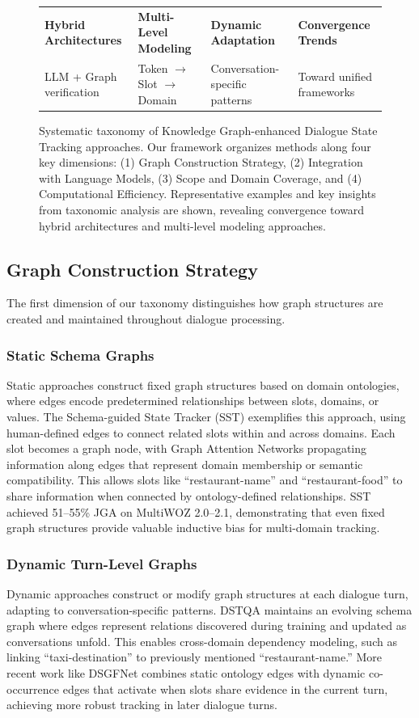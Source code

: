 \documentclass[11pt]{article}
\begin{document}
\begin{figure}[t]
\begin{tabular}{|p{3.5cm}|p{3.5cm}|p{3.5cm}|p{3.5cm}|}
\hline
\textbf{Hybrid Architectures} & \textbf{Multi-Level Modeling} & \textbf{Dynamic Adaptation} & \textbf{Convergence Trends} \\
LLM + Graph verification & Token $\rightarrow$ Slot $\rightarrow$ Domain & Conversation-specific patterns & Toward unified frameworks \\
\hline
\end{tabular}
\caption{Systematic taxonomy of Knowledge Graph-enhanced Dialogue State Tracking approaches. Our framework organizes methods along four key dimensions: (1) Graph Construction Strategy, (2) Integration with Language Models, (3) Scope and Domain Coverage, and (4) Computational Efficiency. Representative examples and key insights from taxonomic analysis are shown, revealing convergence toward hybrid architectures and multi-level modeling approaches.}
\label{fig:taxonomy}
\end{figure}

\subsection{Graph Construction Strategy}

The first dimension of our taxonomy distinguishes how graph structures are created and maintained throughout dialogue processing.

\subsubsection{Static Schema Graphs}
Static approaches construct fixed graph structures based on domain ontologies, where edges encode predetermined relationships between slots, domains, or values. The Schema-guided State Tracker (SST) \citep{Chen2020SST} exemplifies this approach, using human-defined edges to connect related slots within and across domains. Each slot becomes a graph node, with Graph Attention Networks propagating information along edges that represent domain membership or semantic compatibility. This allows slots like ``restaurant-name'' and ``restaurant-food'' to share information when connected by ontology-defined relationships. SST achieved 51–55\% JGA on MultiWOZ 2.0–2.1, demonstrating that even fixed graph structures provide valuable inductive bias for multi-domain tracking.

\subsubsection{Dynamic Turn-Level Graphs}
Dynamic approaches construct or modify graph structures at each dialogue turn, adapting to conversation-specific patterns. DSTQA \citep{Zhou2020DSTQA} maintains an evolving schema graph where edges represent relations discovered during training and updated as conversations unfold. This enables cross-domain dependency modeling, such as linking ``taxi-destination'' to previously mentioned ``restaurant-name.'' More recent work like DSGFNet \citep{Feng2022DSGFNet} combines static ontology edges with dynamic co-occurrence edges that activate when slots share evidence in the current turn, achieving more robust tracking in later dialogue turns.
\end{document}
